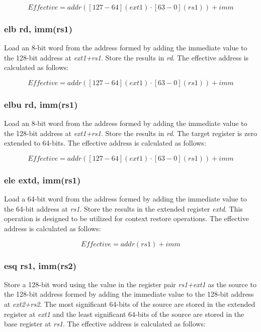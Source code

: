 \documentclass{article}
\begin{document}
\begin{equation}
Effective = addr([127-64](ext1) \cdot [63-0](rs1))+imm
\end{equation}

\subsubsection{elb rd, imm(rs1)}
Load an 8-bit word from the address formed by adding the immediate value to the 
128-bit address at \textit{ext1+rs1}.  Store the results in \textit{rd}.  The effective 
address is calculated as follows: 

\begin{equation}
Effective = addr([127-64](ext1) \cdot [63-0](rs1))+imm
\end{equation}

\subsubsection{elbu rd, imm(rs1)}
Load an 8-bit word from the address formed by adding the immediate value to the 
128-bit address at \textit{ext1+rs1}.  Store the results in \textit{rd}.  
 The target register is zero extended to 64-bits.  The effective 
address is calculated as follows: 

\begin{equation}
Effective = addr([127-64](ext1) \cdot [63-0](rs1))+imm
\end{equation}

\subsubsection{ele extd, imm(rs1)}
Load a 64-bit word from the address formed by adding the immediate value to the 
64-bit address at \textit{rs1}.  Store the results in the extended register \textit{extd}.  
This operation is designed to be utilized for context restore operations.  The effective 
address is calculated as follows: 

\begin{equation}
Effective = addr(rs1)+imm
\end{equation}

\subsubsection{esq rs1, imm(rs2)}
Store a 128-bit word using the value in the register pair \textit{rs1+ext1} 
as the source to the 128-bit address formed by adding the immediate value to 
the 128-bit address at \textit{ext2+rs2}.  The most significant 64-bits of the source 
are stored in the extended register at \textit{ext1} and the least significant 64-bits of the source 
are stored in the base register at \textit{rs1}.  The effective address is calculated 
as follows:  
\end{document}
